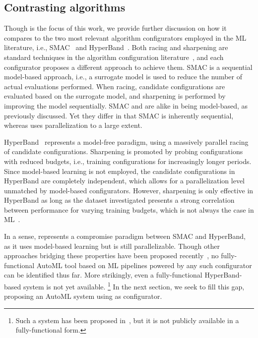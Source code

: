 \subsection{Contrasting algorithms}
Though \irace is the focus of this work, we provide further discussion on how it compares to the two most relevant algorithm configurators employed in the ML literature, i.e., SMAC~\cite{smac} and HyperBand~\cite{li2017hyperband}. Both racing and sharpening are standard techniques in the algorithm configuration literature~\cite{BezLopStu2020}, and each configurator proposes a different approach to achieve them. SMAC is a sequential model-based approach, i.e., a surrogate model is used to reduce the number of actual evaluations performed. When racing, candidate configurations are evaluated based on the surrogate model, and sharpening is performed by improving the model sequentially. SMAC and \irace are alike in being model-based, as previously discussed. Yet they differ in that SMAC is inherently sequential, whereas \irace uses parallelization to a large extent.

HyperBand~\cite{li2017hyperband} represents a model-free paradigm, using a massively parallel racing of candidate configurations. Sharpening is promoted by probing configurations with reduced budgets, i.e., training configurations for increasingly longer periods. Since model-based learning is not employed, the candidate configurations in HyperBand are completely independent, which allows for a parallelization level unmatched by model-based configurators. However, sharpening is only effective in HyperBand as long as the dataset investigated presents a strong correlation between performance for varying training budgets, which is not always the case in ML~\cite{ying2019nasbench}.

In a sense, \irace represents a compromise paradigm between SMAC and HyperBand, as it uses model-based learning but is still parallelizable. Though other approaches bridging these properties have been proposed recently~\cite{falkner2018bohb}, no fully-functional AutoML tool based on ML pipelines powered by any such configurator can be identified thus far. More strikingly, even a fully-functional HyperBand-based system is not yet available.%
\footnote{Such a system has been proposed in~\cite{autoband}, but it is not publicly available in a fully-functional form.}
In the next section, we seek to fill this gap, proposing an AutoML system using \irace as configurator.